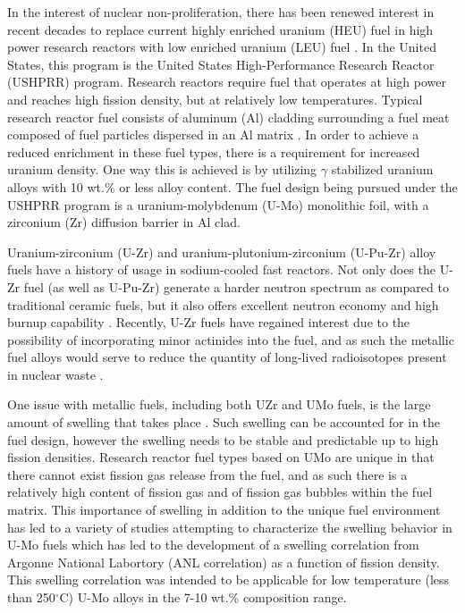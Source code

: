 \documentclass[review]{elsarticle}
\begin{document}
In the interest of nuclear non-proliferation, there has been renewed interest in recent decades to replace current highly enriched uranium (HEU) fuel in high power research reactors with low enriched uranium (LEU) fuel \cite{snelgrove1997}. In the United States, this program is the United States High-Performance Research Reactor (USHPRR) program. Research reactors require fuel that operates at high power and reaches high fission density, but at relatively low temperatures. Typical research reactor fuel consists of aluminum (Al) cladding surrounding a fuel meat composed of fuel particles dispersed in an Al matrix \cite{meyer2014}. In order to achieve a reduced enrichment in these fuel types, there is a requirement for increased uranium density. One way this is achieved is by utilizing $\gamma$ stabilized uranium alloys with 10 wt.\% or less alloy content. The fuel design being pursued under the USHPRR program is a uranium-molybdenum (U-Mo) monolithic foil, with a zirconium (Zr) diffusion barrier in Al clad. 

Uranium-zirconium (U-Zr) and uranium-plutonium-zirconium (U-Pu-Zr) alloy fuels have a history of usage in sodium-cooled fast reactors. Not only does the U-Zr fuel (as well as U-Pu-Zr) generate a harder neutron spectrum as compared to traditional ceramic fuels, but it also offers excellent neutron economy and high burnup capability \cite{hofman1997}. Recently, U-Zr fuels have regained interest due to the possibility of incorporating minor actinides into the fuel, and as such the metallic fuel alloys would serve to reduce the quantity of long-lived radioisotopes present in nuclear waste \cite{capriotti2017}. 

One issue with metallic fuels, including both UZr and UMo fuels, is the large amount of swelling that takes place \cite{hofman1997}. Such swelling can be accounted for in the fuel design, however the swelling needs to be stable and predictable up to high fission densities. Research reactor fuel types based on UMo are unique in that there cannot exist fission gas release from the fuel, and as such there is a relatively high content of fission gas and of fission gas bubbles within the fuel matrix. This importance of swelling in addition to the unique fuel environment has led to a variety of studies attempting to characterize the swelling behavior in U-Mo fuels \cite{rest2009, kim_anl08, meyer2002, kim2013} which has led to the development of a swelling correlation from Argonne National Labortory (ANL correlation) \cite{kim2011} as a function of fission density. This swelling correlation was intended to be applicable for low temperature (less than 250$^{\circ}$C) U-Mo alloys in the 7-10 wt.\% composition range. 
\end{document}
